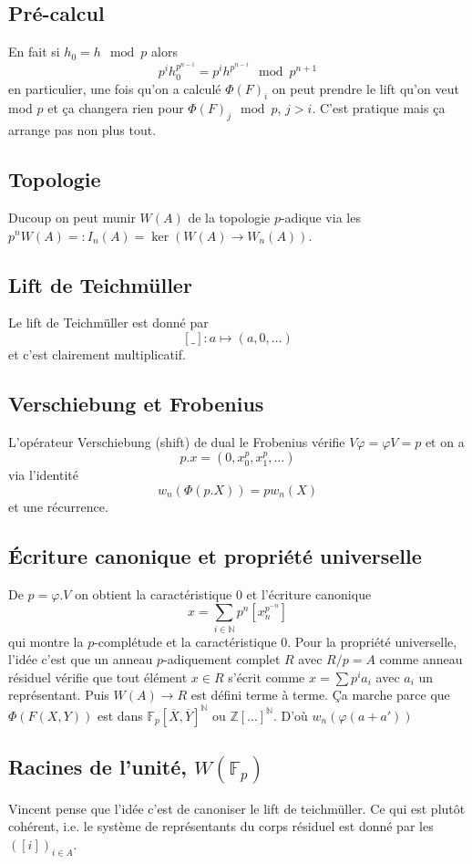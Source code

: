 \documentclass[a4paper,12pt]{article}
\newcommand{\Z}{\mathbb{Z}}
\newcommand{\N}{\mathbb{N}}
\newcommand{\F}{\mathbb F}
\theoremstyle{plain}
\theoremstyle{definition}
\theoremstyle{remark}
\begin{document}
\subsection{Pré-calcul}
En fait si $h_0=h\mod p$ alors 
\[p^ih_0^{p^{n-i}}=p^ih^{p^{n-i}}\mod p^{n+1}\]
en particulier, une fois qu'on a calculé $\Phi(F)_i$ on peut
prendre le lift qu'on veut mod $p$ et ça changera rien pour
$\Phi(F)_j\mod p$, $j>i$. C'est pratique mais ça arrange pas non
plus tout.


\subsection{Topologie}
Ducoup on peut munir $W(A)$ de la topologie $p$-adique via les
$p^nW(A)=:I_n(A)=\ker(W(A)\to W_n(A))$. 

\subsection{Lift de Teichmüller}
Le lift de Teichmüller est donné par
\[[\_]\colon a\mapsto (a,0,\ldots)\]
et c'est clairement multiplicatif.
\subsection{Verschiebung et Frobenius}
L'opérateur Verschiebung (shift) de dual le Frobenius vérifie
$V\varphi=\varphi V=p$ et on a 
\[p.x=(0,x_0^p,x_1^p,\ldots)\]
via l'identité 
\[w_n(\Phi(p.X))=pw_n(X)\]
et une récurrence. 

\subsection{Écriture canonique et propriété universelle}
De $p=\varphi.V$ on obtient la caractéristique $0$ et l'écriture
canonique
\[x=\sum_{i\in \N}p^n[x_n^{p^{-n}}]\]
qui montre la $p$-complétude et la caractéristique $0$. Pour
la propriété universelle, l'idée c'est que un anneau $p$-adiquement
complet $R$ avec $R/p=A$ comme anneau résiduel vérifie que tout 
élément $x\in R$ s'écrit comme $ x=\sum p^ia_i$ avec $a_i$ un
représentant. Puis $W(A)\to R$ est défini terme à terme. Ça
marche parce que $\Phi(F(X,Y))$ est dans $\F_p[\overline X,\overline Y]^\N$
ou $\Z[\ldots]^\N$. D'où $w_n(\varphi(a+a'))$



\subsection{Racines de l'unité, $W(\F_p)$}
Vincent pense que l'idée c'est de canoniser le lift de teichmüller.
Ce qui est plutôt cohérent, i.e. le système de représentants du
corps résiduel est donné par les $([i])_{i\in A}$.
\end{document}
